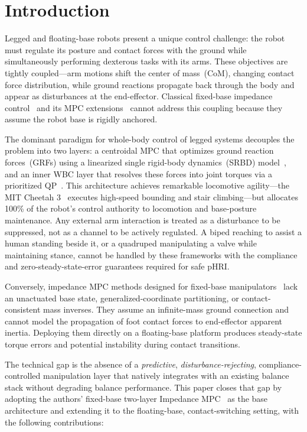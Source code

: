 \documentclass[journal]{IEEEtran}
\begin{document}
\section{Introduction}

Legged and floating-base robots present a unique control challenge: the
robot must regulate its posture and contact forces with the ground while
simultaneously performing dexterous tasks with its arms.
These objectives are tightly coupled---arm motions shift the center of
mass~(CoM), changing contact force distribution, while ground reactions
propagate back through the body and appear as disturbances at the
end-effector.
Classical fixed-base impedance control~\cite{hogan1985impedance} and its
MPC extensions~\cite{cao2023passive,cao2026impedance} cannot address this
coupling because they assume the robot base is rigidly anchored.

The dominant paradigm for whole-body control of legged systems decouples
the problem into two layers: a centroidal MPC that optimizes ground
reaction forces~(GRFs) using a linearized single rigid-body dynamics~(SRBD)
model~\cite{dicarlo2018dynamic,kim2019highly}, and an inner WBC layer that
resolves these forces into joint torques via a prioritized
QP~\cite{bellicoso2016perception,koolen2016design}.
This architecture achieves remarkable locomotive agility---the MIT Cheetah
3~\cite{dicarlo2018dynamic} executes high-speed bounding and stair
climbing---but allocates 100\% of the robot's control authority to
locomotion and base-posture maintenance.
Any external arm interaction is treated as a disturbance to be suppressed,
not as a channel to be actively regulated.
A biped reaching to assist a human standing beside it, or a quadruped
manipulating a valve while maintaining stance, cannot be handled by these
frameworks with the compliance and zero-steady-state-error guarantees
required for safe pHRI.

Conversely, impedance MPC methods designed for fixed-base
manipulators~\cite{cao2026impedance,cao2023passive,haninger2022model,roveda2020model}
lack an unactuated base state, generalized-coordinate partitioning, or
contact-consistent mass inverses.
They assume an infinite-mass ground connection and cannot model the
propagation of foot contact forces to end-effector apparent inertia.
Deploying them directly on a floating-base platform produces steady-state
torque errors and potential instability during contact transitions.

The technical gap is the absence of a \emph{predictive},
\emph{disturbance-rejecting}, compliance-controlled manipulation layer that
natively integrates with an existing balance stack without degrading balance
performance. This paper closes that gap by adopting the authors' fixed-base
two-layer Impedance MPC~\cite{cao2026impedance} as the base architecture
and extending it to the floating-base, contact-switching setting, with the
following contributions:
\end{document}
